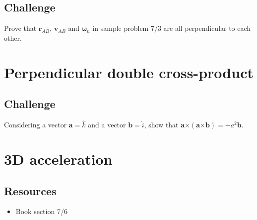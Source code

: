 \subsection*{Challenge}
Prove that $\bm{r}_{AB}$, $\bm{v}_{AB}$ and $\bm{\omega}_n$ in sample problem 7/3 are all perpendicular to each other.




\newpage
\section{Perpendicular double cross-product}

\subsection*{Challenge}
Considering a vector $\bm{a} = \hat{k}$ and a vector $\bm{b} = \hat{i}$, show that $\bm{a} \bm{\times} (\bm{a} \bm{\times} \bm{b}) = -a^2 \bm{b}$.




\newpage
\section{3D acceleration}

\subsection*{Resources}
\begin{itemize}
    \item Book section 7/6
\end{itemize}

